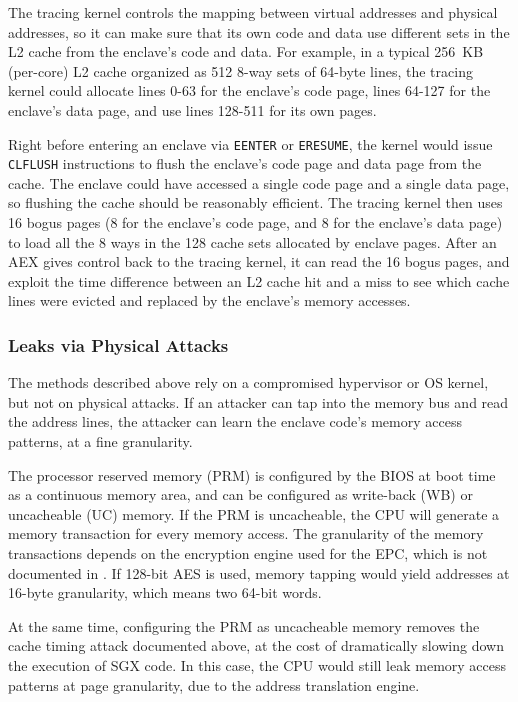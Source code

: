 The tracing kernel controls the mapping between virtual addresses and physical
addresses, so it can make sure that its own code and data use different sets
in the L2 cache from the enclave's code and data. For example, in a typical
256~KB (per-core) L2 cache organized as 512 8-way sets of 64-byte lines, the
tracing kernel could allocate lines 0-63 for the enclave's code page, lines
64-127 for the enclave's data page, and use lines 128-511 for its own pages.

Right before entering an enclave via \texttt{EENTER} or \texttt{ERESUME}, the
kernel would issue \texttt{CLFLUSH} instructions to flush the enclave's code
page and data page from the cache. The enclave could have accessed a single
code page and a single data page, so flushing the cache should be reasonably
efficient. The tracing kernel then uses 16 bogus pages (8 for the enclave's
code page, and 8 for the enclave's data page) to load all the 8 ways in the 128
cache sets allocated by enclave pages. After an AEX gives control back to the
tracing kernel, it can read the 16 bogus pages, and exploit the time difference
between an L2 cache hit and a miss to see which cache lines were evicted and
replaced by the enclave's memory accesses.

\subsubsection{Leaks via Physical Attacks}

The methods described above rely on a compromised hypervisor or OS kernel, but
not on physical attacks. If an attacker can tap into the memory bus and read
the address lines, the attacker can learn the enclave code's memory access
patterns, at a fine granularity.

The processor reserved memory (PRM) is configured by the BIOS at boot time as
a continuous memory area, and can be configured as write-back (WB) or
uncacheable (UC) memory. If the PRM is uncacheable, the CPU will generate a
memory transaction for every memory access. The granularity of the memory
transactions depends on the encryption engine used for the EPC, which is not
documented in \cite{intel2015sdm}. If 128-bit AES is used, memory tapping
would yield addresses at 16-byte granularity, which means two 64-bit words.

At the same time, configuring the PRM as uncacheable memory removes the cache
timing attack documented above, at the cost of dramatically slowing down the
execution of SGX code. In this case, the CPU would still leak memory access
patterns at page granularity, due to the address translation engine.
